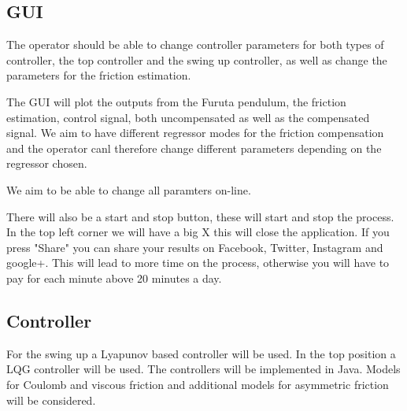 \documentclass[10pt,a4paper]{article}
\begin{document}

\subsection{GUI}
The operator should be able to change controller parameters for both types of controller, the top controller and the swing up controller, as well as change the parameters for the friction estimation. 

The GUI will plot the outputs from the Furuta pendulum, the friction estimation, control signal, both uncompensated as well as the compensated signal. We aim to have different regressor modes for the friction compensation and the operator canl therefore change different parameters depending on the regressor chosen. 

We aim to be able to change all paramters on-line.

There will also be a start and stop button, these will start and stop the process. In the top left corner we will have a big X this will close the application. If you press "Share" you can share your results on Facebook, Twitter, Instagram and google+. This will lead to more time on the process, otherwise you will have to pay for each minute above 20 minutes a day. 


\subsection{Controller}
For the swing up a Lyapunov based controller will be used. In the top position a LQG controller will be used. The controllers will be implemented in Java.
Models for Coulomb and viscous friction and additional models for asymmetric friction will be considered. 
\end{document}
